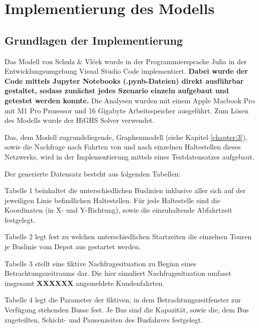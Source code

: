 \chapter{Implementierung des Modells}
\label{chapter:5}
\section{Grundlagen der Implementierung}
Das Modell von Schulz \& Vlćek wurde in der Programmiersprache Julia in der Entwicklungsumgebung Visual Studio Code implementiert. \textbf{Dabei wurde der Code mittels Jupyter Notebooks (.pynb-Dateien) direkt ausführbar gestaltet, sodass zunächst jedes Szenario einzeln aufgebaut und getestet werden konnte.} Die Analysen wurden mit einem Apple Macbook Pro mit M1 Pro Prozessor und 16 Gigabyte Arbeitsspeicher ausgeführt. Zum Lösen des Modells wurde der HiGHS Solver verwendet. 

Das, dem Modell zugrundeliegende, Graphenmodell (siehe Kapitel \ref{chapter:3}), sowie die Nachfrage nach Fahrten von und nach einzelnen Haltestellen dieses Netzwerks, wird in der Implementierung mittels eines Testdatensatzes aufgebaut. %

Der generierte Datensatz besteht aus folgenden Tabellen:

Tabelle 1 beinhaltet die unterschiedlichen Buslinien inklusive aller sich auf der jeweiligen Linie befindlichen Haltestellen. Für jede Haltestelle sind die Koordinaten (in X- und Y-Richtung), sowie die einzuhaltende Abfahrtzeit festgelegt. 

Tabelle 2 legt fest zu welchen unterschiedlichen Startzeiten die einzelnen Touren je Buslinie vom Depot aus gestartet werden. 

Tabelle 3 stellt eine fiktive Nachfragesituation zu Beginn eines Betrachtungszeitraums dar. Die hier simuliert Nachfragesituation umfasst insgesamt \textbf{XXXXXX} angemeldete Kundenfahrten. 

Tabelle 4 legt die Parameter der fiktiven, in dem Betrachtungszeitfenster zur Verfügung stehenden Busse fest. Je Bus sind die Kapazität, sowie die, dem Bus zugeteilten, Schicht- und Pausenzeiten des Busfahrers festgelegt.

